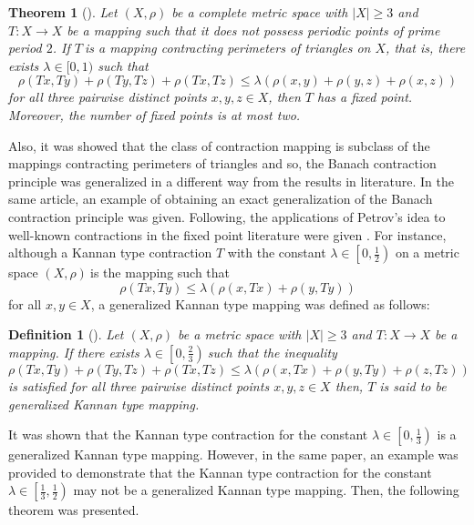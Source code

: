 \documentclass[reqno,11pt]{amsart}
\newtheorem{theorem}{Theorem}
\theoremstyle{plain}
\newtheorem{definition}{Definition}
\numberwithin{equation}{section}
\begin{document}
\begin{theorem}[\protect \cite{Petrov}]
Let $\left( X,\rho \right) $ be a complete metric space with $\left \vert
X\right \vert \geq 3$ and $T:X\rightarrow X$ be a mapping such that it does
not possess periodic points of prime period $2$. If $T~$is a mapping
contracting perimeters of triangles on $X$, that is, there exists $\lambda
\in \lbrack 0,1)$ such that 
\begin{equation*}
\rho \left( Tx,Ty\right) +\rho \left( Ty,Tz\right) +\rho \left( Tx,Tz\right)
\leq \lambda \left( \rho (x,y)+\rho (y,z)+\rho (x,z)\right)
\end{equation*}%
for all three pairwise distinct points $x,y,z\in X$, then $T$ has a fixed
point. Moreover, the number of fixed points is at most two.
\end{theorem}

Also, it was showed that the class of contraction mapping is subclass of the
mappings contracting perimeters of triangles and so, the Banach contraction
principle was generalized in a different way from the results in literature.
In the same article, an example of obtaining an exact generalization of the
Banach contraction principle was given. Following, the applications of
Petrov's idea to well-known contractions in the fixed point literature were
given \cite{PC, PK}. For instance, although a Kannan type contraction $T$
with the constant $\lambda \in \left[ 0,\frac{1}{2}\right) $ on a metric
space $(X,\rho )~$is the mapping such that 
\begin{equation*}
\rho (Tx,Ty)\leq \lambda \left( \rho (x,Tx)+\rho (y,Ty)\right)
\end{equation*}%
for all $x,y\in X$, a generalized Kannan type mapping was defined as follows:

\begin{definition}[\protect \cite{PK}]
Let $\left( X,\rho \right) $ be a metric space with $\left \vert
X\right
\vert \geq 3$ and $T:X\rightarrow X$ be a mapping. If there exists $%
\lambda \in \left[ 0,\frac{2}{3}\right) ~$such that the inequality 
\begin{equation*}
\rho \left( Tx,Ty\right) +\rho \left( Ty,Tz\right) +\rho \left( Tx,Tz\right)
\leq \lambda \left( \rho (x,Tx)+\rho (y,Ty)+\rho (z,Tz)\right)
\end{equation*}%
is satisfied for all three pairwise distinct points $x,y,z\in X$ then, $T$
is said to be generalized Kannan type mapping.
\end{definition}

It was shown that the Kannan type contraction for the constant $\lambda \in %
\left[ 0,\frac{1}{3}\right) $ is a generalized Kannan type mapping. However,
in the same paper, an example was provided to demonstrate that the Kannan
type contraction for the constant $\lambda \in \left[ \frac{1}{3},\frac{1}{2}%
\right) $ may not be a generalized Kannan type mapping. Then, the following
theorem was presented.
\end{document}
